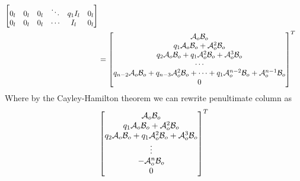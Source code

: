 \begin{appendices}
\begin{equation*}
\begin{split}
\begin{bmatrix}
            0_l & 0_l & 0_l & \ddots & q_1I_l & 0_l \\
            0_l & 0_l & 0_l & \cdots & I_l & 0_l \\
        \end{bmatrix} \\
        &= 
        \begin{bmatrix}
            \mathcal{A}_o\mathcal{B}_o \\ q_1\mathcal{A}_o\mathcal{B}_o + \mathcal{A}^2_o\mathcal{B}_o \\ q_2\mathcal{A}_o\mathcal{B}_o + q_1\mathcal{A}^2_o\mathcal{B}_o + \mathcal{A}^3_o\mathcal{B}_o \\ \cdots \\ q_{n-2}\mathcal{A}_o\mathcal{B}_o + q_{n-3}\mathcal{A}^2_o\mathcal{B}_o + \cdots + q_1\mathcal{A}^{n-2}_o\mathcal{B}_o + \mathcal{A}^{n-1}_o\mathcal{B}_o \\ 0 \\      
        \end{bmatrix}^T
    \end{split}
\end{equation*}
Where by the Cayley-Hamilton theorem we can rewrite penultimate column as
\begin{equation*}
    \begin{bmatrix}
            \mathcal{A}_o\mathcal{B}_o \\ q_1\mathcal{A}_o\mathcal{B}_o + \mathcal{A}^2_o\mathcal{B}_o \\ q_2\mathcal{A}_o\mathcal{B}_o + q_1\mathcal{A}^2_o\mathcal{B}_o + \mathcal{A}^3_o\mathcal{B}_o \\ \vdots \\ -\mathcal{A}^n_o\mathcal{B}_o \\ 0 \\      
        \end{bmatrix}^T
\end{equation*}


\end{appendices}
